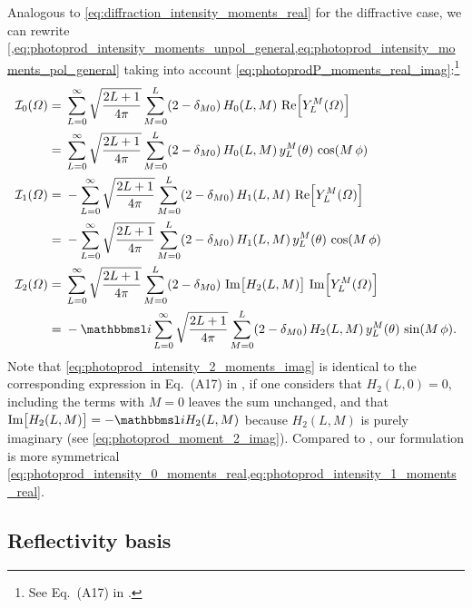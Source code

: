 Analogous to \cref{eq:diffraction_intensity_moments_real} for the
diffractive case, we can rewrite
\cref{,eq:photoprod_intensity_moments_unpol_general,eq:photoprod_intensity_moments_pol_general}
taking into account
\cref{eq:photoprodP_moments_real_imag}:\footnote{See Eq.~(A17) in
.}
\begin{align}
  \mathcal{I}_0(\Omega)
  ={}& \sum_{L = 0}^\infty \sqrt{\frac{2 L + 1}{4 \pi}} \sum_{M = 0}^{L} (2 - \delta_{M 0})\, H_0(L, M)\, \Re{Y_L^M(\Omega)} \notag
  \\
  \label{eq:photoprod_intensity_0_moments_real}
  ={}& \sum_{L = 0}^\infty \sqrt{\frac{2 L + 1}{4 \pi}} \sum_{M = 0}^{L} (2 - \delta_{M 0})\, H_0(L, M)\, y_L^M(\theta)\, \cos(M\, \phi)
  \\
  \mathcal{I}_1(\Omega)
  ={}& -\sum_{L = 0}^\infty \sqrt{\frac{2 L + 1}{4 \pi}} \sum_{M = 0}^{L} (2 - \delta_{M 0})\, H_1(L, M)\, \Re{Y_L^M(\Omega)} \notag
  \\
  \label{eq:photoprod_intensity_1_moments_real}
  ={}& -\sum_{L = 0}^\infty \sqrt{\frac{2 L + 1}{4 \pi}} \sum_{M = 0}^{L} (2 - \delta_{M 0})\, H_1(L, M)\, y_L^M(\theta)\, \cos(M\, \phi)
  \\
  \mathcal{I}_2(\Omega)
  ={}& \sum_{L = 0}^\infty \sqrt{\frac{2 L + 1}{4 \pi}} \sum_{M = 0}^{L} (2 - \delta_{M 0})\, \Im{H_2(L, M)}\, \Im{Y_L^M(\Omega)} \notag
  \\
  \label{eq:photoprod_intensity_2_moments_imag}
  ={}& -\imag \sum_{L = 0}^\infty \sqrt{\frac{2 L + 1}{4 \pi}} \sum_{M = 0}^{L} (2 - \delta_{M 0})\, H_2(L, M)\, y_L^M(\theta)\, \sin(M\, \phi).
\end{align}
Note that \cref{eq:photoprod_intensity_2_moments_imag} is identical to
the corresponding expression in Eq.~(A17) in
, if one considers that $H_2(L, 0) = 0$, \ie
including the terms with $M = 0$ leaves the sum unchanged, and that
$\Im{H_2(L, M)} = -\imag H_2(L, M)$ because $H_2(L, M)$ is purely
imaginary (see \cref{eq:photoprod_moment_2_imag}).  Compared to
, our formulation is more symmetrical \wrt
\cref{eq:photoprod_intensity_0_moments_real,eq:photoprod_intensity_1_moments_real}.


\subsection{Reflectivity basis}%
\label{sec:photoprod:reflectivity}

